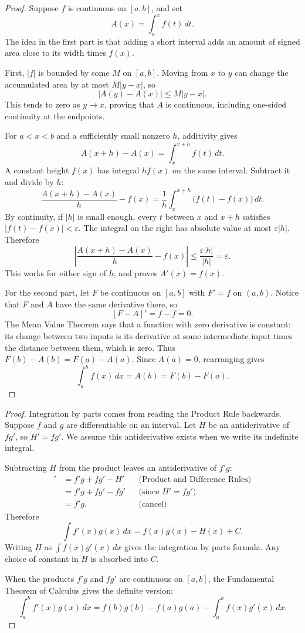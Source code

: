 \begin{proof}
Suppose $f$ is continuous on $[a,b]$, and set
$$A(x)=\int_a^x f(t)\,dt.$$
The idea in the first part is that adding a short interval adds an
amount of signed area close to its width times $f(x)$.

First, $|f|$ is bounded by some $M$ on $[a,b]$. Moving from $x$ to $y$
can change the accumulated area by at most $M|y-x|$, so
$$|A(y)-A(x)|\leq M|y-x|.$$
This tends to zero as $y\to x$, proving that $A$ is continuous, including
one-sided continuity at the endpoints.

For $a<x<b$ and a sufficiently small nonzero $h$, additivity gives
$$A(x+h)-A(x)=\int_x^{x+h}f(t)\,dt.$$
A constant height $f(x)$ has integral $hf(x)$ on the same interval.
Subtract it and divide by $h$:
$$
\frac{A(x+h)-A(x)}h-f(x)
=\frac1h\int_x^{x+h}\bigl(f(t)-f(x)\bigr)\,dt.
$$
By continuity, if $|h|$ is small enough, every $t$ between $x$ and $x+h$
satisfies $|f(t)-f(x)|<\varepsilon$. The integral on the right has
absolute value at most $\varepsilon|h|$. Therefore
$$
\left|\frac{A(x+h)-A(x)}h-f(x)\right|
\leq\frac{\varepsilon|h|}{|h|}=\varepsilon.
$$
This works for either sign of $h$, and proves $A'(x)=f(x)$.

For the second part, let $F$ be continuous on $[a,b]$ with $F'=f$
on $(a,b)$. Notice that $F$ and $A$ have the same derivative there, so
$$[F-A]'=f-f=0.$$
The Mean Value Theorem says that a function with zero derivative is
constant: its change between two inputs is its derivative at some
intermediate input times the distance between them, which is zero.
Thus $F(b)-A(b)=F(a)-A(a)$. Since $A(a)=0$, rearranging gives
$$\int_a^b f(x)\,dx=A(b)=F(b)-F(a).$$
\end{proof}



\begin{proof}
Integration by parts comes from reading the Product Rule backwards.
Suppose $f$ and $g$ are differentiable on an interval. Let $H$ be an
antiderivative of $fg'$, so $H'=fg'$. We assume this antiderivative exists
when we write its indefinite integral.

Subtracting $H$ from the product leaves an antiderivative of $f'g$:
\begin{align*}
[fg-H]'&=f'g+fg'-H' &&\text{(Product and Difference Rules)}\\
&=f'g+fg'-fg' &&\text{(since $H'=fg'$)}\\
&=f'g. &&\text{(cancel)}
\end{align*}
Therefore
$$\int f'(x)g(x)\,dx=f(x)g(x)-H(x)+C.$$
Writing $H$ as $\int f(x)g'(x)\,dx$ gives the integration by parts
formula. Any choice of constant in $H$ is absorbed into $C$.

When the products $f'g$ and $fg'$ are continuous on $[a,b]$, the
Fundamental Theorem of Calculus gives the definite version:
$$\int_a^b f'(x)g(x)\,dx
=f(b)g(b)-f(a)g(a)-\int_a^b f(x)g'(x)\,dx.$$
\end{proof}

